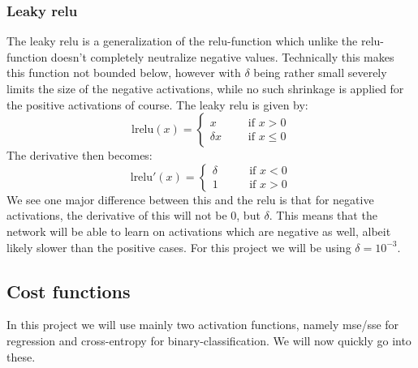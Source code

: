\documentclass{article}
\begin{document}
\subsubsection{Leaky relu}
The leaky relu is a generalization of the relu-function which unlike the
relu-function doesn't completely neutralize negative values.  Technically this
makes this function not bounded below, however with $\delta$ being rather small
severely limits the size of the negative activations, while no such shrinkage is
applied for the positive activations of course. The leaky relu is given by:
$$\text{lrelu}(x) = \begin{cases}
            x \qquad & \text{if } x > 0    \\
            \delta x & \text{if } x \leq 0
      \end{cases}$$
The derivative then becomes:
$$\text{lrelu}'(x) = \begin{cases}
            \delta \qquad & \text{if } x < 0 \\
            1             & \text{if } x > 0
      \end{cases}$$
We see one major difference between this and the relu is that for negative
activations, the derivative of this will not be $0$, but $\delta$. This means
that the network will be able to learn on activations which are negative as
well, albeit likely slower than the positive cases. For this project we will be
using $\delta = 10^{-3}$.

\subsection{Cost functions}
In this project we will use mainly two activation functions, namely mse/sse for
regression and cross-entropy for binary-classification. We will now quickly go
into these.
\end{document}

